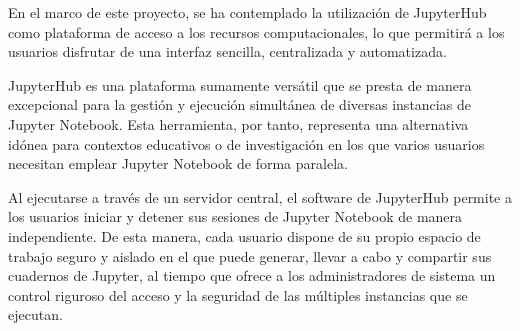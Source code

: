 \begin{spacing}{1.5}
    En el marco de este proyecto, se ha contemplado la utilización de JupyterHub como plataforma de acceso a los recursos computacionales, lo que permitirá a los usuarios disfrutar de una interfaz sencilla, centralizada y automatizada.

    JupyterHub es una plataforma sumamente versátil que se presta de manera excepcional para la gestión y ejecución simultánea de diversas instancias de Jupyter Notebook. Esta herramienta, por tanto, representa una alternativa idónea para contextos educativos o de investigación en los que varios usuarios necesitan emplear Jupyter Notebook de forma paralela.

    Al ejecutarse a través de un servidor central, el software de JupyterHub permite a los usuarios iniciar y detener sus sesiones de Jupyter Notebook de manera independiente. De esta manera, cada usuario dispone de su propio espacio de trabajo seguro y aislado en el que puede generar, llevar a cabo y compartir sus cuadernos de Jupyter, al tiempo que ofrece a los administradores de sistema un control riguroso del acceso y la seguridad de las múltiples instancias que se ejecutan.

  \mylinespacing
  \mylinespacing
  \begin{tightcenter}
  \end{tightcenter}
\end{spacing}
